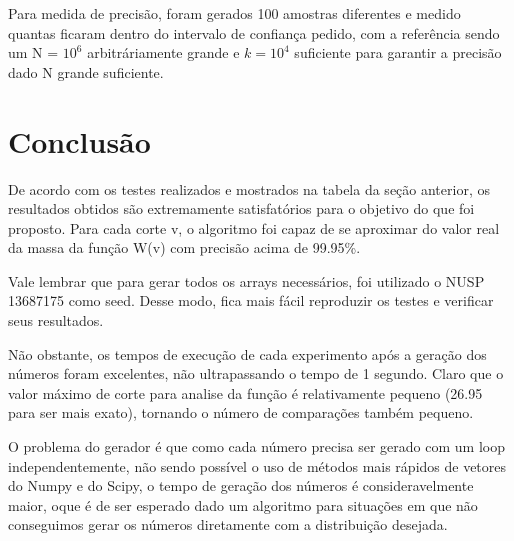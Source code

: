 \documentclass{article}
\begin{document}
	Para medida de precisão, foram gerados 100 amostras diferentes e medido quantas ficaram dentro do intervalo de confiança pedido, com a referência sendo um N = $10^6$ arbitráriamente grande e $k = 10^4$ suficiente para garantir a precisão dado N grande suficiente. 
	
	\section{Conclusão}

        De acordo com os testes realizados e mostrados na tabela da seção anterior,
        os resultados obtidos são extremamente satisfatórios para o objetivo do que foi
        proposto. Para cada corte v, o algoritmo foi capaz de se aproximar do valor
        real da massa da função W(v) com precisão acima de 99.95\%.
        
        Vale lembrar que para gerar todos os arrays necessários, foi utilizado o NUSP
        13687175 como seed. Desse modo, fica mais fácil reproduzir os testes e verificar
        seus resultados.


        Não obstante, os tempos de execução de cada experimento após a geração dos números foram excelentes,
        não ultrapassando o tempo de 1 segundo. Claro que o valor máximo de corte
        para analise da função é relativamente pequeno (26.95 para ser mais exato),
        tornando o número de comparações também pequeno. 

 	O problema do gerador é que como cada número precisa ser gerado com um loop independentemente, não sendo possível
  	o uso de métodos mais rápidos de vetores do Numpy e do Scipy, o tempo de geração dos números 
  	é consideravelmente maior, oque é de ser esperado dado um algoritmo para situações em que não conseguimos gerar
   	os números diretamente com a distribuição desejada. 
    
\end{document}
